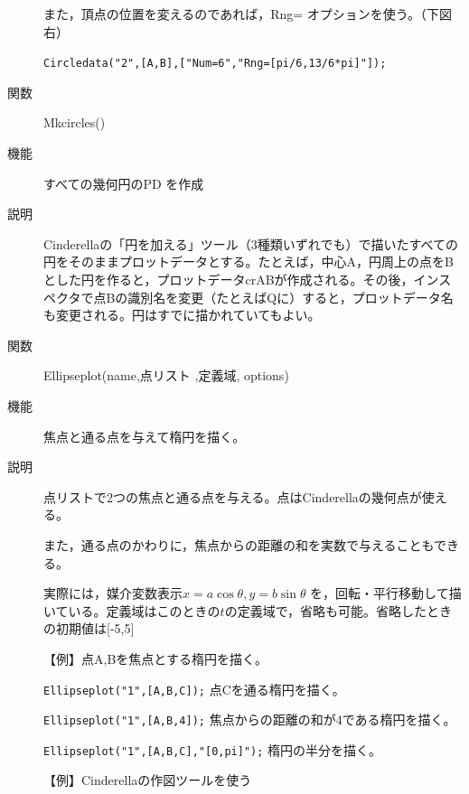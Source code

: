 \documentclass[papersize,a4paper,12pt,uplatex]{jsarticle}
\begin{document}
\begin{description}
また，頂点の位置を変えるのであれば，Rng= オプションを使う。（下図右）

 \verb|Circledata("2",[A,B],["Num=6","Rng=[pi/6,13/6*pi]"]);|

\hspace{10mm} 
\hspace{5mm}  


\vspace{\baselineskip}
\hypertarget{mkcircles}{}
\item[関数]  Mkcircles()
\item[機能]  すべての幾何円のPD を作成
\item[説明]  Cinderellaの「円を加える」ツール（3種類いずれでも）で描いたすべての円をそのままプロットデータとする。たとえば，中心A，円周上の点をBとした円を作ると，プロットデータcrABが作成される。その後，インスペクタで点Bの識別名を変更（たとえばQに）すると，プロットデータ名も変更される。円はすでに描かれていてもよい。

\vspace{\baselineskip}
\hypertarget{ellipseplot}{}
\item[関数]  Ellipseplot(name,点リスト ,定義域, options)
\item[機能]  焦点と通る点を与えて楕円を描く。
\item[説明]  点リストで2つの焦点と通る点を与える。点はCinderellaの幾何点が使える。

  また，通る点のかわりに，焦点からの距離の和を実数で与えることもできる。
  
  実際には，媒介変数表示$x=a \cos \theta,y=b \sin \theta$ を，回転・平行移動して描いている。定義域はこのときの$t$の定義域で，省略も可能。省略したときの初期値は[-5,5]

\vspace{\baselineskip}
【例】点A,Bを焦点とする楕円を描く。

\verb|Ellipseplot("1",[A,B,C]);|   点Cを通る楕円を描く。

\verb|Ellipseplot("1",[A,B,4]);|   焦点からの距離の和が4である楕円を描く。

\verb|Ellipseplot("1",[A,B,C],"[0,pi]");|   楕円の半分を描く。

\vspace{\baselineskip}
【例】Cinderellaの作図ツールを使う


\end{description}
\end{document}
